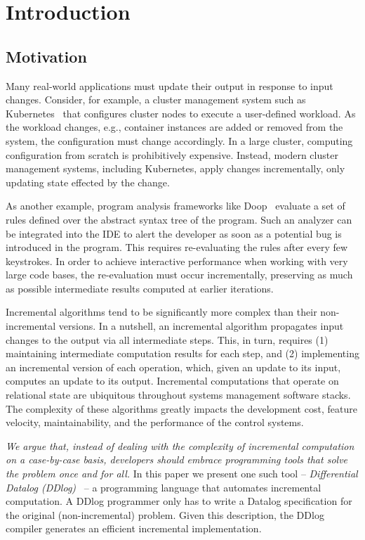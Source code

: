 \section{Introduction}\label{sec-introduction}

\subsection{Motivation}

Many real-world applications must update their output in response to input changes.  Consider, for
example, a cluster management system such as Kubernetes~\cite{kubernetes} that configures cluster
nodes to execute a user-defined workload.  As the workload changes, e.g., container instances are
added or removed from the system, the configuration must change accordingly.  In a large cluster,
computing configuration from scratch is prohibitively expensive.  Instead, modern cluster management
systems, including Kubernetes, apply changes incrementally, only updating state effected by the
change.

As another example, program analysis frameworks like Doop~\cite{Bravenboer-oopsla09} evaluate a set
of rules defined over the abstract syntax tree of the program.  Such an analyzer can be integrated
into the IDE to alert the developer as soon as a potential bug is introduced in the program.  This
requires re-evaluating the rules after every few keystrokes.  In order to achieve interactive
performance when working with very large code bases, the re-evaluation must occur incrementally,
preserving as much as possible intermediate results computed at earlier iterations.

Incremental algorithms tend to be significantly more complex than
their non-incremental versions.  In a nutshell, an incremental
algorithm propagates input changes to the output via all intermediate
steps.  This, in turn, requires (1) maintaining intermediate
computation results for each step, and (2) implementing an incremental
version of each operation, which, given an update to its input,
computes an update to its output.  Incremental computations that
operate on relational state are ubiquitous throughout systems
management software stacks.  The complexity of these algorithms
greatly impacts the development cost, feature velocity,
maintainability, and the performance of the control systems.

\emph{We argue that, instead of dealing with the complexity of
  incremental computation on a case-by-case basis,
  developers should embrace programming tools that solve the problem
  once and for all.}  In this paper we present one such tool -- \emph{Differential Datalog
  (DDlog)}~\cite{ddlog} -- a programming language that automates
incremental computation.  A DDlog programmer only has to write a
Datalog specification for the original (non-incremental) problem.  Given
this description, the DDlog compiler generates an efficient
incremental implementation.  

